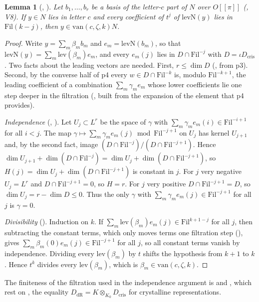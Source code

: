 \documentclass[11pt]{article}
\newcommand{\Fil}{\mathrm{Fil}}
\newtheorem{lemma}{Lemma}
\theoremstyle{definition}
\theoremstyle{remark}
\begin{document}
\begin{lemma}[, ]\label{lem:van}
Let $b_1,\dots,b_r$ be a basis of the letter-$c$ part of $N$ over $O[[\pi]]$ (, V8). If $y\in N$ lies in letter $c$ and every coefficient of $t^j$ of $\mathrm{levN}(y)$ lies in $\Fil(k-j)$, then $y\in\mathrm{van}(c,\zeta,k)N$.
\end{lemma}

\begin{proof}
Write $y=\sum_m\beta_mb_m$ and $e_m=\mathrm{levN}(b_m)$, so that $\mathrm{levN}(y)=\sum_m\mathrm{lev}(\beta_m)e_m$, and every $e_m(j)$ lies in $D\cap\Fil^{-j}$ with $D=\iota D_{\mathrm{cris}}$. Two facts about the leading vectors are needed. First, $r\le\dim D$ (, from p3). Second, by the converse half of p4 every $w\in D\cap\Fil^{-k}$ is, modulo $\Fil^{-k+1}$, the leading coefficient of a combination $\sum_m\gamma_me_m$ whose lower coefficients lie one step deeper in the filtration (, built from the expansion of the element that p4 provides).

\emph{Independence} (, ). Let $U_j\subset L^r$ be the space of $\gamma$ with $\sum_m\gamma_me_m(i)\in\Fil^{-i+1}$ for all $i<j$. The map $\gamma\mapsto\sum_m\gamma_me_m(j)\bmod\Fil^{-j+1}$ on $U_j$ has kernel $U_{j+1}$ and, by the second fact, image $(D\cap\Fil^{-j})/(D\cap\Fil^{-j+1})$. Hence $\dim U_{j+1}+\dim(D\cap\Fil^{-j})=\dim U_j+\dim(D\cap\Fil^{-j+1})$, so $H(j)=\dim U_j+\dim(D\cap\Fil^{-j+1})$ is constant in $j$. For $j$ very negative $U_j=L^r$ and $D\cap\Fil^{-j+1}=0$, so $H=r$. For $j$ very positive $D\cap\Fil^{-j+1}=D$, so $\dim U_j=r-\dim D\le0$. Thus the only $\gamma$ with $\sum_m\gamma_me_m(j)\in\Fil^{-j+1}$ for all $j$ is $\gamma=0$.

\emph{Divisibility} (). Induction on $k$. If $\sum_m\mathrm{lev}(\beta_m)e_m(j)\in\Fil^{k+1-j}$ for all $j$, then subtracting the constant terms, which only moves terms one filtration step (), gives $\sum_m\beta_m(0)e_m(j)\in\Fil^{-j+1}$ for all $j$, so all constant terms vanish by independence. Dividing every $\mathrm{lev}(\beta_m)$ by $t$ shifts the hypothesis from $k+1$ to $k$. Hence $t^k$ divides every $\mathrm{lev}(\beta_m)$, which is $\beta_m\in\mathrm{van}(c,\zeta,k)$.
\end{proof}

The finiteness of the filtration used in the independence argument is  and , which rest on , the equality $D_{\mathrm{dR}}=K\otimes_{K_0}D_{\mathrm{cris}}$ for crystalline representations.
\end{document}
